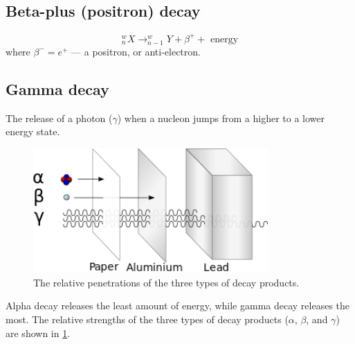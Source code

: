 \documentclass[a4paper]{amsbook}
\theoremstyle{definition}
\numberwithin{exercise}{chapter}
\numberwithin{exercise}{chapter}
\begin{document}
\subsection*{Beta-plus (positron) decay}
\begin{displaymath}
  ^w_n X \rightarrow ^{w}_{n - 1} Y + \beta^+ + \text{ energy}
\end{displaymath}
where $ \beta^- = e^+ $ --- a positron, or anti-electron.

\subsection*{Gamma decay}
The release of a photon ($\gamma$) when a nucleon jumps from a higher to a lower energy state.

\begin{figure}
  \centering
  \includegraphics[width=0.8\textwidth]{penetration}
  \caption{The relative penetrations of the three types of decay products. \label{fig:penetration}}
\end{figure}
Alpha decay releases the least amount of energy, while gamma decay releases the most. The relative strengths of the three types of
decay products ($ \alpha $, $ \beta $, and $ \gamma $) are shown in \cref{fig:penetration}.
\end{document}

